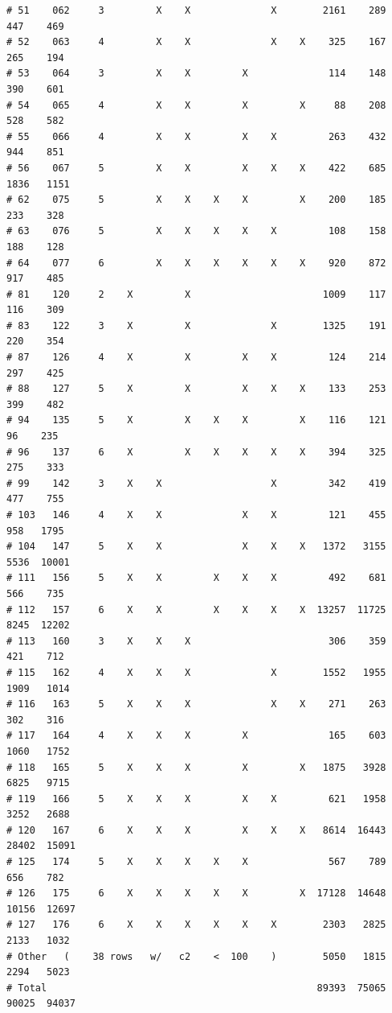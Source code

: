 \documentclass{article}\usepackage[]{graphicx}\usepackage[]{color}
\makeatletter
\newenvironment{kframe}{%
 \def\at@end@of@kframe{}%
 \ifinner\ifhmode%
  \def\at@end@of@kframe{\end{minipage}}%
  \begin{minipage}{\columnwidth}%
 \fi\fi%
 \def\FrameCommand##1{\hskip\@totalleftmargin \hskip-\fboxsep
 \colorbox{shadecolor}{##1}\hskip-\fboxsep
     \hskip-\linewidth \hskip-\@totalleftmargin \hskip\columnwidth}%
 \MakeFramed {\advance\hsize-\width
   \@totalleftmargin\z@ \linewidth\hsize
   \@setminipage}}%
 {\par\unskip\endMakeFramed%
 \at@end@of@kframe}
\newenvironment{knitrout}{}{} %
\makeatother
\begin{document}
\begin{knitrout}
\begin{kframe}
\begin{verbatim}
# 51    062     3         X    X              X        2161    289    447    469
# 52    063     4         X    X              X    X    325    167    265    194
# 53    064     3         X    X         X              114    148    390    601
# 54    065     4         X    X         X         X     88    208    528    582
# 55    066     4         X    X         X    X         263    432    944    851
# 56    067     5         X    X         X    X    X    422    685   1836   1151
# 62    075     5         X    X    X    X         X    200    185    233    328
# 63    076     5         X    X    X    X    X         108    158    188    128
# 64    077     6         X    X    X    X    X    X    920    872    917    485
# 81    120     2    X         X                       1009    117    116    309
# 83    122     3    X         X              X        1325    191    220    354
# 87    126     4    X         X         X    X         124    214    297    425
# 88    127     5    X         X         X    X    X    133    253    399    482
# 94    135     5    X         X    X    X         X    116    121     96    235
# 96    137     6    X         X    X    X    X    X    394    325    275    333
# 99    142     3    X    X                   X         342    419    477    755
# 103   146     4    X    X              X    X         121    455    958   1795
# 104   147     5    X    X              X    X    X   1372   3155   5536  10001
# 111   156     5    X    X         X    X    X         492    681    566    735
# 112   157     6    X    X         X    X    X    X  13257  11725   8245  12202
# 113   160     3    X    X    X                        306    359    421    712
# 115   162     4    X    X    X              X        1552   1955   1909   1014
# 116   163     5    X    X    X              X    X    271    263    302    316
# 117   164     4    X    X    X         X              165    603   1060   1752
# 118   165     5    X    X    X         X         X   1875   3928   6825   9715
# 119   166     5    X    X    X         X    X         621   1958   3252   2688
# 120   167     6    X    X    X         X    X    X   8614  16443  28402  15091
# 125   174     5    X    X    X    X    X              567    789    656    782
# 126   175     6    X    X    X    X    X         X  17128  14648  10156  12697
# 127   176     6    X    X    X    X    X    X        2303   2825   2133   1032
# Other   (    38 rows   w/   c2    <  100    )        5050   1815   2294   5023
# Total                                               89393  75065  90025  94037
\end{verbatim}

\end{kframe}
\end{knitrout}
\end{document}
